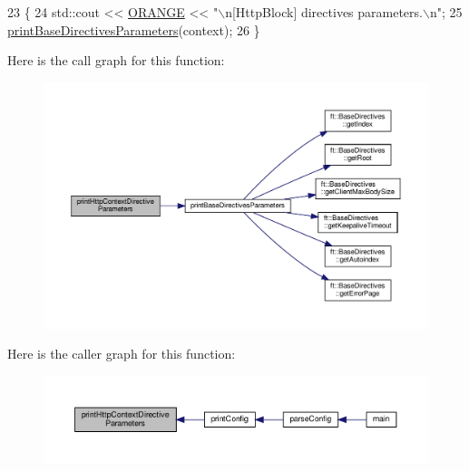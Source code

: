 \begin{DoxyCode}
23     \{
24         std::cout << \hyperlink{_print_config_8hpp_ac5b6e19bf06822021f35602c59658de3}{ORANGE} << \textcolor{stringliteral}{"\(\backslash\)n[HttpBlock] directives parameters.\(\backslash\)n"};
25         \hyperlink{classft_1_1_print_config_ad71821d54e46c04a81d26dbabd3c4b20}{printBaseDirectivesParameters}(context);
26     \}
\end{DoxyCode}
Here is the call graph for this function\+:
\nopagebreak
\begin{figure}[H]
\begin{center}
\leavevmode
\includegraphics[width=350pt]{classft_1_1_print_config_af912dc88061594effceb350034b7c5d9_cgraph}
\end{center}
\end{figure}
Here is the caller graph for this function\+:
\nopagebreak
\begin{figure}[H]
\begin{center}
\leavevmode
\includegraphics[width=350pt]{classft_1_1_print_config_af912dc88061594effceb350034b7c5d9_icgraph}
\end{center}
\end{figure}
\mbox{\label{classft_1_1_print_config_a8862bb68558be4a7286c6ce05db3fa4d}} 
